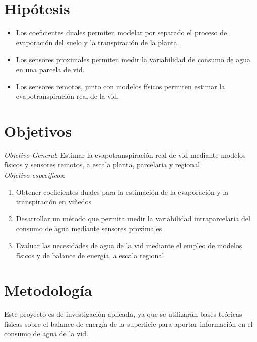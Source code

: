 \documentclass[]{article}
\begin{document}
\section{Hipótesis}
\begin{itemize}
\item Los coeficientes duales permiten modelar por separado el proceso de evaporación del suelo y la transpiración de la planta.
\item Los sensores proximales permiten medir la variabilidad de consumo de agua en una parcela de vid.
\item Los sensores remotos, junto con modelos físicos permiten estimar la evapotranspiración real de la vid.


\end{itemize}

\section{Objetivos}

\textit{Objetivo General}: Estimar la evapotranspiración real de vid mediante modelos físicos y sensores remotos, a escala planta, parcelaria y regional \\

\textit{Objetivo específicos}: 
\begin{enumerate}
	\item Obtener coeficientes duales para la estimación de la evaporación y la transpiración en viñedos
	\item Desarrollar un método que permita medir la variabilidad intraparcelaria del consumo de agua mediante sensores proximales
	\item Evaluar las necesidades de agua de la vid mediante el empleo de modelos físicos y de balance de energía, a escala regional
\end{enumerate}

\section{Metodología}

Este proyecto es de investigación aplicada, ya que se utilizarán bases teóricas físicas sobre el balance de energía de la superficie para aportar información en el consumo de agua de la vid.
\end{document}
